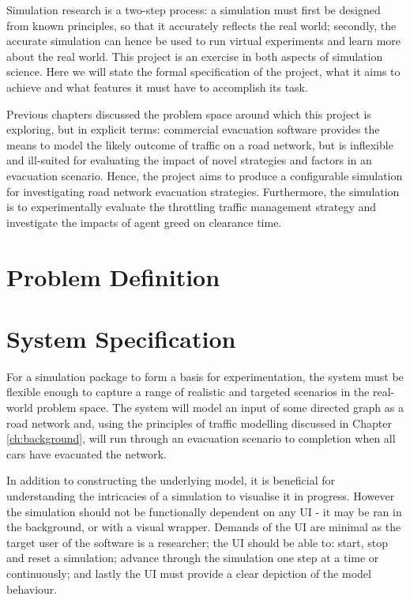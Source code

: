 Simulation research is a two-step process: a simulation must first be designed from known principles, so that it accurately reflects the real world; secondly, the accurate simulation can hence be used to run virtual experiments and learn more about the real world. This project is an exercise in both aspects of simulation science. Here we will state the formal specification of the project, what it aims to achieve and what features it must have to accomplish its task.

Previous chapters discussed the problem space around which this project is exploring, but in explicit terms: commercial evacuation software provides the means to model the likely outcome of traffic on a road network, but is inflexible and ill-suited for evaluating the impact of novel strategies and factors in an evacuation scenario. Hence, the project aims to produce a configurable simulation for investigating road network evacuation strategies. Furthermore, the simulation is to experimentally evaluate the throttling traffic management strategy and investigate the impacts of agent greed on clearance time.
\section{Problem Definition}

\section{System Specification}

For a simulation package to form a basis for experimentation, the system must be flexible enough to capture a range of realistic and targeted scenarios in the real-world problem space. The system will model an input of some directed graph as a road network and, using the principles of traffic modelling discussed in Chapter \ref{ch:background}, will run through an evacuation scenario to completion when all cars have evacuated the network.

In addition to constructing the underlying model, it is beneficial for understanding the intricacies of a simulation to visualise it in progress. However the simulation should not be functionally dependent on any UI -  it may be ran in the background, or with a visual wrapper. Demands of the UI are minimal as the target user of the software is a researcher; the UI should be able to: start, stop and reset a simulation; advance through the simulation one step at a time or continuously; and lastly the UI must provide a clear depiction of the model behaviour.

